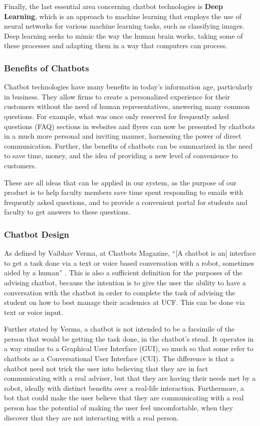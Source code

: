 \documentclass[titlepage, 12pt]{article}
\begin{document}
Finally, the last essential area concerning chatbot technologies is \textbf{Deep Learning}, which is an approach to machine learning that employs the use of neural networks for various machine learning tasks, such as classifying images. Deep learning seeks to mimic the way the human brain works, taking some of these processes and adapting them in a way that computers can process.

\subsubsection{Benefits of Chatbots}

Chatbot technologies have many benefits in today's information age, particularly in business. They allow firms to create a personalized experience for their customers without the need of human representatives, answering many common questions. For example, what was once only reserved for frequently asked questions (FAQ) sections in websites and flyers can now be presented by chatbots in a much more personal and inviting manner, harnessing the power of direct communication. Further, the benefits of chatbots can be summarized in the need to save time, money, and the idea of providing a new level of convenience to customers.

These are all ideas that can be applied in our system, as the purpose of our product is to help faculty members save time spent responding to emails with frequently asked questions, and to provide a convenient portal for students and faculty to get answers to these questions.

\subsubsection{Chatbot Design}

As defined by Vaibhav Verma, at Chatbots Magazine, “[A chatbot is an] interface to get a task done via a text or voice based conversation with a robot, sometimes aided by a human” \cite{bib-1-11}. This is also a sufficient definition for the purposes of the advising chatbot, because the intention is to give the user the ability to have a conversation with the chatbot in order to complete the task of advising the student on how to best manage their academics at UCF. This can be done via text or voice input.

Further stated by Verma, a chatbot is not intended to be a facsimile of the person that would be getting the task done, in the chatbot’s stead. It operates in a way similar to a Graphical User Interface (GUI), so much so that some refer to chatbots as a Conversational User Interface (CUI). The difference is that a chatbot need not trick the user into believing that they are in fact communicating with a real adviser, but that they are having their needs met by a robot, ideally with distinct benefits over a real-life interaction. Furthermore, a bot that could make the user believe that they are communicating with a real person has the potential of making the user feel uncomfortable, when they discover that they are not interacting with a real person.
\end{document}
